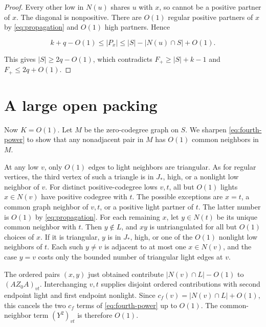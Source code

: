 \documentclass[11pt,reqno]{amsart}
\theoremstyle{definition}
\theoremstyle{remark}
\numberwithin{equation}{section}
\begin{document}
\begin{proof}
Every other low in \(N(u)\) shares \(u\) with \(x\), so cannot be a positive partner of \(x\). The diagonal is nonpositive. There are \(O(1)\) regular positive partners of \(x\) by \eqref{eq:propagation} and \(O(1)\) high partners. Hence

\[
k+q-O(1)\le |P_x|\le |S|-|N(u)\cap S|+O(1).
\]

This gives \(|S|\ge2q-O(1)\), which contradicts \(F_+\ge |S|+k-1\) and \(F_+\le2q+O(1)\).
\end{proof}


\section{A large open packing}\label{sec:packing}

Now \(K=O(1)\). Let \(M\) be the zero-codegree graph on \(S\). We sharpen \eqref{eq:fourth-power} to show that any nonadjacent pair in \(M\) has \(O(1)\) common neighbors in \(M\).

At any low \(v\), only \(O(1)\) edges to light neighbors are triangular. As for regular vertices, the third vertex of such a triangle is in \(J_*\), high, or a nonlight low neighbor of \(v\). For distinct positive-codegree lows \(v,t\), all but \(O(1)\) lights \(x\in N(v)\) have positive codegree with \(t\). The possible exceptions are \(x=t\), a common graph neighbor of \(v,t\), or a positive light partner of \(t\). The latter number is \(O(1)\) by \eqref{eq:propagation}. For each remaining \(x\), let \(y\in N(t)\) be its unique common neighbor with \(t\). Then \(y\notin L\), and \(xy\) is untriangulated for all but \(O(1)\) choices of \(x\). If it is triangular, \(y\) is in \(J_*\), high, or one of the \(O(1)\) nonlight low neighbors of \(t\). Each such \(y\ne v\) is adjacent to at most one \(x\in N(v)\), and the case \(y=v\) costs only the bounded number of triangular light edges at \(v\).

The ordered pairs \((x,y)\) just obtained contribute \(|N(v)\cap L|-O(1)\) to \((AZ_0A)_{vt}\). Interchanging \(v,t\) supplies disjoint ordered contributions with second endpoint light and first endpoint nonlight. Since \(c_f(v)=|N(v)\cap L|+O(1)\), this cancels the two \(c_f\) terms of \eqref{eq:fourth-power} up to \(O(1)\). The common-neighbor term \((Y^2)_{vt}\) is therefore \(O(1)\).
\end{document}
